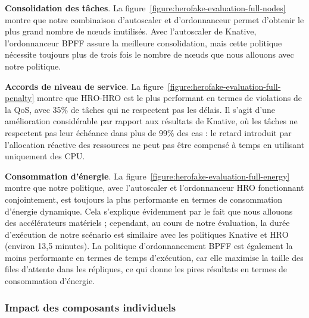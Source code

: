 \textbf{Consolidation des tâches}. La figure~\ref{figure:herofake-evaluation-full-nodes} montre que notre combinaison d'autoscaler et d'ordonnanceur permet d'obtenir le plus grand nombre de nœuds inutilisés. Avec l'autoscaler de Knative, l'ordonnanceur \gls{BPFF} assure la meilleure consolidation, mais cette politique nécessite toujours plus de trois fois le nombre de nœuds que nous allouons avec notre politique.

\textbf{Accords de niveau de service}. La figure~\ref{figure:herofake-evaluation-full-penalty} montre que HRO-HRO est le plus performant en termes de violations de la \gls{QoS}, avec 35\% de tâches qui ne respectent pas les délais. Il s'agit d'une amélioration considérable par rapport aux résultats de Knative, où les tâches ne respectent pas leur échéance dans plus de 99\% des cas : le retard introduit par l'allocation réactive des ressources ne peut pas être compensé à temps en utilisant uniquement des \gls{CPU}.

\textbf{Consommation d'énergie}. La figure~\ref{figure:herofake-evaluation-full-energy} montre que notre politique, avec l'autoscaler et l'ordonnanceur HRO fonctionnant conjointement, est toujours la plus performante en termes de consommation d'énergie dynamique. Cela s'explique évidemment par le fait que nous allouons des accélérateurs matériels ; cependant, au cours de notre évaluation, la durée d'exécution de notre scénario est similaire avec les politiques Knative et HRO (environ 13,5 minutes). La politique d'ordonnancement \gls{BPFF} est également la moins performante en termes de temps d'exécution, car elle maximise la taille des files d'attente dans les répliques, ce qui donne les pires résultats en termes de consommation d'énergie.

\subsubsection{Impact des composants individuels}

